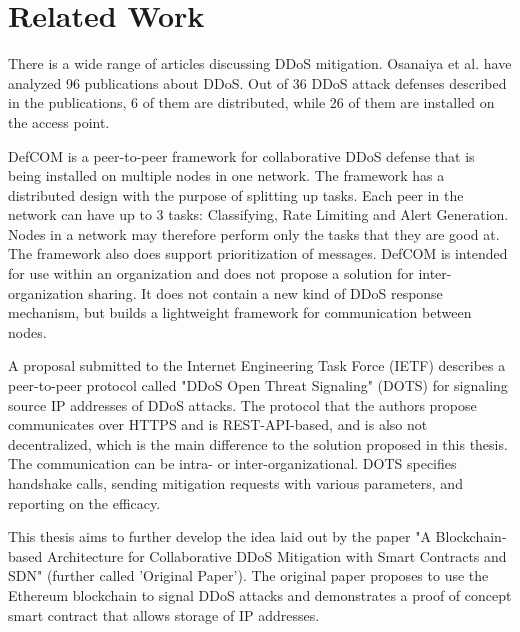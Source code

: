 \chapter{Related Work}

There is a wide range of articles discussing DDoS mitigation. Osanaiya et al. \cite{DDoSOverview} have analyzed 96 publications about DDoS. Out of 36 DDoS attack defenses described in the publications, 6 of them are distributed, while 26 of them are installed on the access point. 

DefCOM \cite{DefCOM} is a peer-to-peer framework for collaborative DDoS defense that is being installed on multiple nodes in one network. The framework has a distributed design with the purpose of splitting up tasks. Each peer in the network can have up to 3 tasks: Classifying, Rate Limiting and Alert Generation. Nodes in a network may therefore perform only the tasks that they are good at. The framework also does support prioritization of messages. DefCOM is intended for use within an organization and does not propose a solution for inter-organization sharing. It does not contain a new kind of DDoS response mechanism, but builds a lightweight framework for communication between nodes.

A proposal submitted to the Internet Engineering Task Force (IETF) \cite{IETFDraft} describes a peer-to-peer protocol called "DDoS Open Threat Signaling" (DOTS) for signaling source IP addresses of DDoS attacks. The protocol that the authors propose communicates over HTTPS and is REST-API-based, and is also not decentralized, which is the main difference to the solution proposed in this thesis. The communication can be intra- or  inter-organizational. DOTS specifies handshake calls, sending mitigation requests with various parameters, and reporting on the efficacy.

This thesis aims to further develop the idea laid out by the paper "A Blockchain-based Architecture for Collaborative DDoS Mitigation with Smart Contracts and SDN" \cite{OriginalPaper} (further called 'Original Paper'). The original paper proposes to use the Ethereum blockchain to signal DDoS attacks and demonstrates a proof of concept smart contract that allows storage of IP addresses. 
